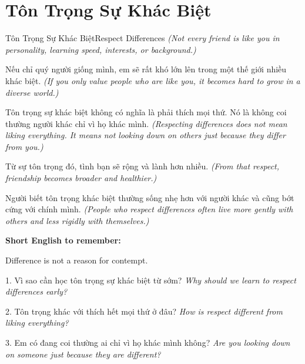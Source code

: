 \section{Tôn Trọng Sự Khác Biệt}
\begin{truyen}{Tôn Trọng Sự Khác Biệt}{Respect Differences}
\textit{(Not every friend is like you in personality, learning speed, interests, or background.)}

Nếu chỉ quý người giống mình, em sẽ rất khó lớn lên trong một thế giới nhiều khác biệt.
\textit{(If you only value people who are like you, it becomes hard to grow in a diverse world.)}

Tôn trọng sự khác biệt không có nghĩa là phải thích mọi thứ. Nó là không coi thường người khác chỉ vì họ khác mình.
\textit{(Respecting differences does not mean liking everything. It means not looking down on others just because they differ from you.)}

Từ sự tôn trọng đó, tình bạn sẽ rộng và lành hơn nhiều.
\textit{(From that respect, friendship becomes broader and healthier.)}
\end{truyen}

\begin{baihoc}
Người biết tôn trọng khác biệt thường sống nhẹ hơn với người khác và cũng bớt cứng với chính mình.
\textit{(People who respect differences often live more gently with others and less rigidly with themselves.)}
\end{baihoc}

\begin{ghinhoanh}
\textbf{Short English to remember:}

Difference is not a reason for contempt.

\end{ghinhoanh}

\begin{tuhocnhanh}
1. Vì sao cần học tôn trọng sự khác biệt từ sớm? \textit{Why should we learn to respect differences early?}

2. Tôn trọng khác với thích hết mọi thứ ở đâu? \textit{How is respect different from liking everything?}

3. Em có đang coi thường ai chỉ vì họ khác mình không? \textit{Are you looking down on someone just because they are different?}
\end{tuhocnhanh}
\ngancach


